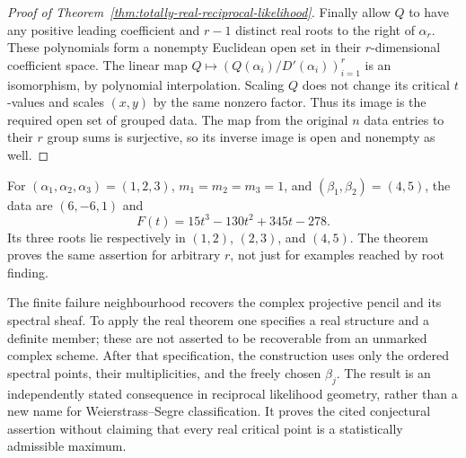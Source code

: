 \begin{proof}[Proof of Theorem~\ref{thm:totally-real-reciprocal-likelihood}]
Finally allow \(Q\) to have any positive leading coefficient and
\(r-1\) distinct real roots to the right of \(\alpha_r\).
These polynomials form a nonempty Euclidean open set in their
\(r\)-dimensional coefficient space.  The linear map
\(Q\mapsto(Q(\alpha_i)/D'(\alpha_i))_{i=1}^r\) is an
isomorphism, by polynomial interpolation.  Scaling \(Q\) does
not change its critical \(t\)-values and scales \((x,y)\) by
the same nonzero factor.  Thus its image is the required open set
of grouped data.  The map from the original \(n\) data entries
to their \(r\) group sums is surjective, so its inverse image is
open and nonempty as well.
\end{proof}

\begin{example}\label{ex:real-likelihood-three-eigenvalues}
For \((\alpha_1,\alpha_2,\alpha_3)=(1,2,3)\),
\(m_1=m_2=m_3=1\), and \((\beta_1,\beta_2)=(4,5)\),
the data are \((6,-6,1)\) and
\[
                    F(t)=15t^3-130t^2+345t-278.
\]
Its three roots lie respectively in \((1,2)\), \((2,3)\),
and \((4,5)\).  The theorem proves the same assertion for
arbitrary \(r\), not just for examples reached by root finding.
\end{example}

\begin{remark}
\label{rem:real-likelihood-reconstruction-scope}
The finite failure neighbourhood recovers the complex projective
pencil and its spectral sheaf.  To apply the real theorem one
specifies a real structure and a definite member; these are not
asserted to be recoverable from an unmarked complex scheme.
After that specification, the construction uses only the ordered
spectral points, their multiplicities, and the freely chosen
\(\beta_j\).  The result is an independently stated consequence
in reciprocal likelihood geometry, rather than a new name for
Weierstrass--Segre classification.  It proves the cited conjectural
assertion without claiming that every real critical point is a
statistically admissible maximum.
\end{remark}
